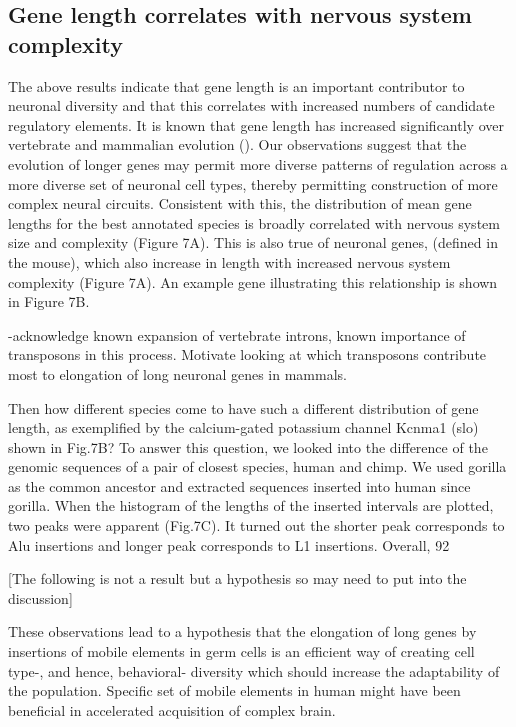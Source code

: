 \subsection{Gene length correlates with nervous system complexity}

The above results indicate that gene length is an important contributor to neuronal diversity and that this correlates with increased numbers of candidate regulatory elements. It is known that gene length has increased significantly over vertebrate and mammalian evolution (). Our observations suggest that the evolution of longer genes may permit more diverse patterns of regulation across a more diverse set of neuronal cell types, thereby permitting construction of more complex neural circuits. Consistent with this, the distribution of mean gene lengths for the best annotated species is broadly correlated with nervous system size and complexity (Figure 7A). This is also true of neuronal genes, (defined in the mouse), which also increase in length with increased nervous system complexity (Figure 7A). An example gene illustrating this relationship is shown in Figure 7B. 

-acknowledge known expansion of vertebrate introns, known importance of transposons in this process. Motivate looking at which transposons contribute most to elongation of long neuronal genes in mammals.

Then how different species come to have such a different distribution of gene length, as exemplified by the calcium-gated potassium channel Kcnma1 (slo) shown in Fig.7B? To answer this question, we looked into the difference of the genomic sequences of a pair of closest species, human and chimp. We used gorilla as the common ancestor and extracted sequences inserted into human since gorilla. When the histogram of the lengths of the inserted intervals are plotted, two peaks were apparent (Fig.7C). It turned out the shorter peak corresponds to Alu insertions and longer peak corresponds to L1 insertions. Overall, 92%

[The following is not a result but a hypothesis so may need to put into the discussion]

These observations lead to a hypothesis that the elongation of long genes by insertions of mobile elements in germ cells is an efficient way of creating cell type-, and hence, behavioral- diversity which should increase the adaptability of the population. Specific set of mobile elements in human might have been beneficial in accelerated acquisition of complex brain.
